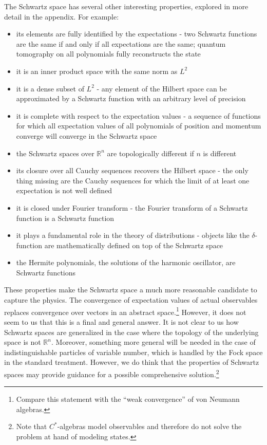 \documentclass[10pt,twocolumn, nofootinbib]{revtex4-2}
\begin{document}
The Schwartz space has several other interesting properties,\cite{moretti_spectral_2017, reed_methods_1980, hall_quantum_2013, rauch_solution_1991} explored in more detail in the appendix. For example:

\begin{itemize}
\item its elements are fully identified by the expectations - two Schwartz functions are the same if and only if all expectations are the same; quantum tomography on all polynomials fully reconstructs the state
\item it is an inner product space with the same norm as $L^2$
\item it is a dense subset of $L^2$ - any element of the Hilbert space can be approximated by a Schwartz function with an arbitrary level of precision
\item it is complete with respect to the expectation values - a sequence of functions for which all expectation values of all polynomials of position and momentum converge will converge in the Schwartz space
\item the Schwartz spaces over $\mathbb{R}^{n}$ are topologically different if $n$ is different
\item its closure over all Cauchy sequences recovers the Hilbert space - the only thing missing are the Cauchy sequences for which the limit of at least one expectation is not well defined
\item it is closed under Fourier transform - the Fourier transform of a Schwartz function is a Schwartz function
\item it plays a fundamental role in the theory of distributions - objects like the $\delta$-function are mathematically defined on top of the Schwartz space
\item the Hermite polynomials, the solutions of the harmonic oscillator, are Schwartz functions
\end{itemize}
These properties make the Schwartz space a much more reasonable candidate to capture the physics.\cite{albert2022bosonic} The convergence of expectation values of actual observables replaces convergence over vectors in an abstract space.\footnote{Compare this statement with the ``weak convergence'' of von Neumann algebras.} However, it does not seem to us that this is a final and general answer. It is not clear to us how Schwartz spaces are generalized in the case where the topology of the underlying space is not $\mathbb{R}^n$. Moreover, something more general will be needed in the case of indistinguishable particles of variable number, which is handled by the Fock space in the standard treatment. However, we do think that the properties of Schwartz spaces may provide guidance for a possible comprehensive solution.\footnote{Note that $C^*$-algebras model observables and therefore do not solve the problem at hand of modeling states.}
\end{document}

